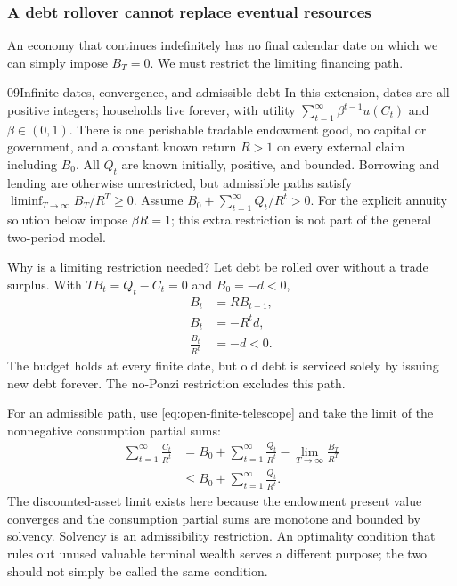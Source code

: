\subsubsection{A debt rollover cannot replace eventual resources}

An economy that continues indefinitely has no final calendar date on which
we can simply impose $B_T=0$. We must restrict the limiting financing path.

\begin{modelsetup}[1]
\begin{modelcondition}{09}{Infinite dates, convergence, and admissible debt}
In this extension, dates are all positive integers; households live forever,
with utility $\sum_{t=1}^\infty\beta^{t-1}u(C_t)$ and $\beta\in(0,1)$.
There is one perishable tradable endowment good, no capital or government,
and a constant known return $R>1$ on every external claim including $B_0$.
All $Q_t$ are known initially, positive, and bounded. Borrowing and lending
are otherwise unrestricted, but admissible paths satisfy
$\liminf_{T\to\infty}B_T/R^T\geq0$. Assume
$B_0+\sum_{t=1}^\infty Q_t/R^t>0$.
For the explicit annuity solution below impose $\beta R=1$; this extra
restriction is not part of the general two-period model.
\end{modelcondition}
\end{modelsetup}

Why is a limiting restriction needed? Let debt be rolled over without a trade
surplus. With $TB_t=Q_t-C_t=0$ and $B_0=-d<0$,
\begin{align}
 B_t&=RB_{t-1},\\
 B_t&=-R^td,\\
 \frac{B_t}{R^t}&=-d<0.
\end{align}
The budget holds at every finite date, but old debt is serviced solely by
issuing new debt forever. The no-Ponzi restriction excludes this path.

For an admissible path, use \eqref{eq:open-finite-telescope} and take the
limit of the nonnegative consumption partial sums:
\begin{align}
 \sum_{t=1}^\infty\frac{C_t}{R^t}
 &=B_0+\sum_{t=1}^\infty\frac{Q_t}{R^t}
       -\lim_{T\to\infty}\frac{B_T}{R^T}\\
 &\leq B_0+\sum_{t=1}^\infty\frac{Q_t}{R^t}.\label{eq:open-infinite-pv}
\end{align}
The discounted-asset limit exists here because the endowment present value
converges and the consumption partial sums are monotone and bounded by
solvency. Solvency is an admissibility restriction. An optimality condition
that rules out unused valuable terminal wealth serves a different purpose;
the two should not simply be called the same condition.

